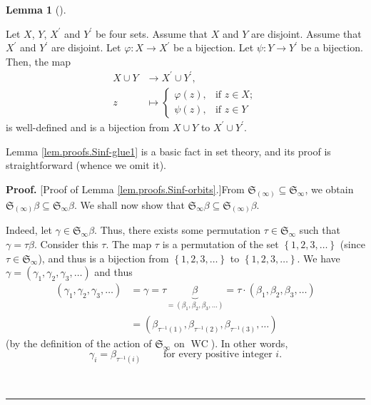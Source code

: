\documentclass[numbers=enddot,12pt,final,onecolumn,notitlepage]{scrartcl}%
\theoremstyle{definition}
\newtheorem{lem}[theo]{Lemma}
\newenvironment{lemma}[1][]
{\begin{lem}[#1]\begin{leftbar}}
{\end{leftbar}\end{lem}}
\newenvironment{proof}[1][Proof]{\noindent\textbf{#1.} }{\ \rule{0.5em}{0.5em}}
\newenvironment{verlong}{}{}
\begin{document}
\begin{verlong}
\begin{lemma}
\label{lem.proofs.Sinf-glue1}Let $X$, $Y$, $X^{\prime}$ and $Y^{\prime}$ be
four sets. Assume that $X$ and $Y$ are disjoint. Assume that $X^{\prime}$ and
$Y^{\prime}$ are disjoint. Let $\varphi:X\rightarrow X^{\prime}$ be a
bijection. Let $\psi:Y\rightarrow Y^{\prime}$ be a bijection. Then, the map%
\begin{align*}
X\cup Y  &  \rightarrow X^{\prime}\cup Y^{\prime},\\
z  &  \mapsto%
\begin{cases}
\varphi\left(  z\right)  , & \text{if }z\in X;\\
\psi\left(  z\right)  , & \text{if }z\in Y
\end{cases}
\end{align*}
is well-defined and is a bijection from $X\cup Y$ to $X^{\prime}\cup
Y^{\prime}$.
\end{lemma}

Lemma \ref{lem.proofs.Sinf-glue1} is a basic fact in set theory, and its proof
is straightforward (whence we omit it).

\begin{proof}
[Proof of Lemma \ref{lem.proofs.Sinf-orbits}.]From $\mathfrak{S}_{\left(
\infty\right)  }\subseteq\mathfrak{S}_{\infty}$, we obtain $\mathfrak{S}%
_{\left(  \infty\right)  }\beta\subseteq\mathfrak{S}_{\infty}\beta$. We shall
now show that $\mathfrak{S}_{\infty}\beta\subseteq\mathfrak{S}_{\left(
\infty\right)  }\beta$.

Indeed, let $\gamma\in\mathfrak{S}_{\infty}\beta$. Thus, there exists some
permutation $\tau\in\mathfrak{S}_{\infty}$ such that $\gamma=\tau\beta$.
Consider this $\tau$. The map $\tau$ is a permutation of the set $\left\{
1,2,3,\ldots\right\}  $ (since $\tau\in\mathfrak{S}_{\infty}$), and thus is a
bijection from $\left\{  1,2,3,\ldots\right\}  $ to $\left\{  1,2,3,\ldots
\right\}  $. We have $\gamma=\left(  \gamma_{1},\gamma_{2},\gamma_{3}%
,\ldots\right)  $ and thus%
\begin{align*}
\left(  \gamma_{1},\gamma_{2},\gamma_{3},\ldots\right)   &  =\gamma
=\tau\underbrace{\beta}_{=\left(  \beta_{1},\beta_{2},\beta_{3},\ldots\right)
}=\tau\cdot\left(  \beta_{1},\beta_{2},\beta_{3},\ldots\right) \\
&  =\left(  \beta_{\tau^{-1}\left(  1\right)  },\beta_{\tau^{-1}\left(
2\right)  },\beta_{\tau^{-1}\left(  3\right)  },\ldots\right)
\end{align*}
(by the definition of the action of $\mathfrak{S}_{\infty}$ on
$\operatorname*{WC}$). In other words,%
\begin{equation}
\gamma_{i}=\beta_{\tau^{-1}\left(  i\right)  }\ \ \ \ \ \ \ \ \ \ \text{for
every positive integer }i. \label{pf.lem.proofs.Sinf-orbits.gbt}%
\end{equation}



\end{proof}
\end{verlong}
\end{document}
